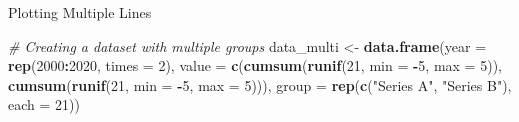 \documentclass[
  ignorenonframetext,
]{beamer}
\newenvironment{Shaded}{\begin{snugshade}}{\end{snugshade}}
\newcommand{\AttributeTok}[1]{\textcolor[rgb]{0.13,0.29,0.53}{#1}}
\newcommand{\CommentTok}[1]{\textcolor[rgb]{0.56,0.35,0.01}{\textit{#1}}}
\newcommand{\DecValTok}[1]{\textcolor[rgb]{0.00,0.00,0.81}{#1}}
\newcommand{\FunctionTok}[1]{\textcolor[rgb]{0.13,0.29,0.53}{\textbf{#1}}}
\newcommand{\NormalTok}[1]{#1}
\newcommand{\OtherTok}[1]{\textcolor[rgb]{0.56,0.35,0.01}{#1}}
\newcommand{\SpecialCharTok}[1]{\textcolor[rgb]{0.81,0.36,0.00}{\textbf{#1}}}
\newcommand{\StringTok}[1]{\textcolor[rgb]{0.31,0.60,0.02}{#1}}
\begin{document}
\begin{frame}[fragile]{Plotting Multiple Lines}
\label{plotting-multiple-lines}

\begin{Shaded}
\begin{Highlighting}[]
\CommentTok{\# Creating a dataset with multiple groups}
\NormalTok{data\_multi }\OtherTok{\textless{}{-}} \FunctionTok{data.frame}\NormalTok{(}\AttributeTok{year =} \FunctionTok{rep}\NormalTok{(}\DecValTok{2000}\SpecialCharTok{:}\DecValTok{2020}\NormalTok{, }\AttributeTok{times =} \DecValTok{2}\NormalTok{), }\AttributeTok{value =} \FunctionTok{c}\NormalTok{(}\FunctionTok{cumsum}\NormalTok{(}\FunctionTok{runif}\NormalTok{(}\DecValTok{21}\NormalTok{,}
    \AttributeTok{min =} \SpecialCharTok{{-}}\DecValTok{5}\NormalTok{, }\AttributeTok{max =} \DecValTok{5}\NormalTok{)), }\FunctionTok{cumsum}\NormalTok{(}\FunctionTok{runif}\NormalTok{(}\DecValTok{21}\NormalTok{, }\AttributeTok{min =} \SpecialCharTok{{-}}\DecValTok{5}\NormalTok{, }\AttributeTok{max =} \DecValTok{5}\NormalTok{))),}
    \AttributeTok{group =} \FunctionTok{rep}\NormalTok{(}\FunctionTok{c}\NormalTok{(}\StringTok{"Series A"}\NormalTok{, }\StringTok{"Series B"}\NormalTok{), }\AttributeTok{each =} \DecValTok{21}\NormalTok{))}
\end{Highlighting}
\end{Shaded}
\end{frame}
\end{document}
